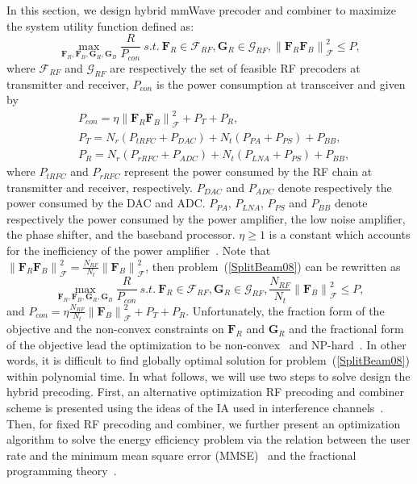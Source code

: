 \documentclass[11pt,draftcls,onecolumn]{IEEEtran}
\begin{document}
In this section, we design hybrid mmWave precoder and combiner to maximize the system utility function defined as:
\begin{equation}\label{SplitBeam08}
\max_{\bm{F}_{R},\bm{F}_{B},\bm{G}_{R},\bm{G}_{B}}\frac{R}{P_{con}}
~s.t.~\bm{F}_{R}\in \mathcal{F}_{RF}, \bm{G}_{R}\in \mathcal{G}_{RF}, \left\|\bm{F}_{R}\bm{F}_{B}\right\|_{\mathcal{F}}^{2}\leq P,
\end{equation}
where $\mathcal{F}_{RF}$ and $\mathcal{G}_{RF}$ are respectively the set of feasible RF precoders at transmitter and receiver, $P_{con}$ is the power consumption at transceiver and given by
\begin{subequations}\label{SplitBeam09}
\begin{align}
&P_{con}=\eta\left\|\bm{F}_{R}\bm{F}_{B}\right\|_{\mathcal{F}}^{2}+P_{T}+P_{R},\\
&P_{T}=N_{r}\left(P_{tRFC}+P_{DAC}\right)+N_{t}\left(P_{PA}+P_{PS}\right)+P_{BB},\\
&P_{R}=N_{r}\left(P_{rRFC}+P_{ADC}\right)+N_{t}\left(P_{LNA}+P_{PS}\right)+P_{BB},
\end{align}
\end{subequations}
where $P_{tRFC}$ and $P_{rRFC}$ represent the power consumed by the RF chain at transmitter and receiver, respectively. $P_{DAC}$ and $P_{ADC}$ denote respectively the power consumed by the DAC and ADC. $P_{PA}$, $P_{LNA}$, $P_{PS}$ and $P_{BB}$ denote respectively the power consumed by the power amplifier, the low noise amplifier, the phase shifter, and the baseband processor. $\eta\geq 1$ is a constant which accounts for the inefficiency of the power amplifier~\cite{TWCNg201209}.  Note that $\left\|\bm{F}_{R}\bm{F}_{B}\right\|_{\mathcal{F}}^{2}=\frac{N_{RF}}{N_{t}}\left\|\bm{F}_{B}\right\|_{\mathcal{F}}^{2}$, then problem~(\ref{SplitBeam08}) can be rewritten as
\begin{equation}\label{SplitBeam10}
\max_{\bm{F}_{R},\bm{F}_{B},\bm{G}_{R},\bm{G}_{B}}\frac{R}{P_{con}}
~s.t.~\bm{F}_{R}\in \mathcal{F}_{RF}, \bm{G}_{R}\in \mathcal{G}_{RF}, \frac{N_{RF}}{N_{t}}\left\|\bm{F}_{B}\right\|_{\mathcal{F}}^{2}\leq P,
\end{equation}
and $P_{con}=\eta\frac{N_{RF}}{N_{t}}\left\|\bm{F}_{B}\right\|_{\mathcal{F}}^{2}+P_{T}+P_{R}$. Unfortunately, the fraction form of the objective and the non-convex constraints on $\bm{F}_{R}$ and $\bm{G}_{R}$ and the fractional form of the objective lead the optimization to be non-convex~\cite{JstorJagan1966,JstorDink1967} and NP-hard~\cite{TWCNg201209,TCOMHE2013,TSPHE2014}. In other words, it is difficult to find globally optimal solution for problem~(\ref{SplitBeam08}) within polynomial time. In what follows, we will use two steps to solve design the hybrid precoding. First, an alternative optimization RF precoding and combiner scheme is presented using the ideas of the IA used in interference channels~\cite{TITGou2010,TITGoma2011}. Then, for fixed RF precoding and combiner, we further present an optimization algorithm to solve the energy efficiency problem via the relation between the user rate and the minimum mean square error (MMSE)~\cite{TWCChri2008} and the fractional programming theory~\cite{JstorJagan1966,JstorDink1967}.
\end{document}
